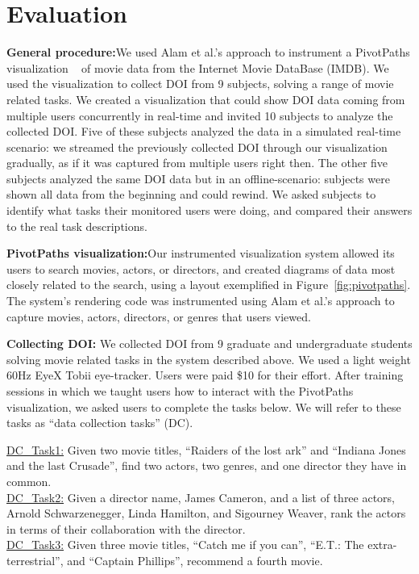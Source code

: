 \section{Evaluation}
\label{sec:Evaluation}

\textbf{General procedure:}We used Alam et al.'s approach to instrument a PivotPaths visualization ~\cite{dork2012pivotpaths} of movie data from the Internet Movie DataBase (IMDB). We used the visualization to collect DOI from 9 subjects, solving a range of movie related tasks. We created a visualization that could show DOI data coming from multiple users concurrently in real-time and invited 10 subjects to analyze the collected DOI. Five of these subjects analyzed the data in a simulated real-time scenario: we streamed the previously collected DOI through our visualization gradually, as if it was captured from multiple users right then. The other five subjects analyzed the same DOI data but in an offline-scenario: subjects were shown all data from the beginning and could rewind. We asked subjects to identify what tasks their monitored users were doing, and compared their answers to the real task descriptions.

\textbf{PivotPaths visualization:}Our instrumented visualization system allowed its users to search movies, actors, or directors, and created diagrams of data most closely related to the search, using a layout exemplified in Figure~\ref{fig:pivotpaths}. The system's rendering code was instrumented using Alam et al.'s approach to capture movies, actors, directors, or genres that users viewed.

\textbf{Collecting DOI:} We collected DOI from 9 graduate and undergraduate students solving movie related tasks in the system described above. We used a light weight 60Hz EyeX Tobii eye-tracker. Users were paid \$10 for their effort. After training sessions in which we taught users how to interact with the PivotPaths visualization, we asked users to complete the tasks below. We will refer to these tasks as ``data collection tasks'' (DC).

\noindent
\underline{DC\_Task1:} Given two movie titles, ``Raiders of the lost ark'' and ``Indiana Jones and the last Crusade'', find two actors, two genres, and one director they have in common.\\
\underline{DC\_Task2:} Given a director name, James Cameron, and a list of three actors, Arnold Schwarzenegger, Linda Hamilton, and Sigourney Weaver, rank the actors in terms of their collaboration with the director. \\
\underline{DC\_Task3:} Given three movie titles, ``Catch me if you can'', ``E.T.: The extra-terrestrial'', and ``Captain Phillips'', recommend a fourth movie.
 
